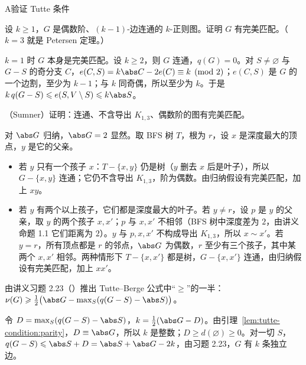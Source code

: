\begin{exercises}{A}{验证 Tutte 条件}
\item\label{ex:tutte-condition:A1} 设 $k\geqslant1$，$G$ 是偶数阶、$(k-1)$-边连通的 $k$-正则图。证明 $G$ 有完美匹配。（$k=3$ 就是 Petersen 定理。）
\begin{solution}
$k=1$ 时 $G$ 本身是完美匹配。设 $k\geqslant2$，则 $G$ 连通，$q(G)=0$。对 $S\neq\varnothing$ 与 $G-S$ 的奇分支 $C$，$e(C,S)=k\abs C-2e(C)\equiv k\pmod2$；$e(C,S)$ 是 $G$ 的一个边割，至少为 $k-1$；与 $k$ 同奇偶，所以至少为 $k$。于是 $k\,q(G-S)\leqslant e(S,V\setminus S)\leqslant k\abs S$。
\end{solution}

\item\label{ex:tutte-condition:A2} （Sumner）证明：连通、不含导出 $K_{1,3}$、偶数阶的图有完美匹配。
\begin{solution}
对 $\abs G$ 归纳，$\abs G=2$ 显然。取 BFS 树 $T$，根为 $r$，设 $x$ 是深度最大的顶点，$y$ 是它的父亲。
\begin{itemize}
\item 若 $y$ 只有一个孩子 $x$：$T-\{x,y\}$ 仍是树（$y$ 删去 $x$ 后是叶子），所以 $G-\{x,y\}$ 连通；它仍不含导出 $K_{1,3}$，阶为偶数。由归纳假设有完美匹配，加上 $xy$。
\item 若 $y$ 有两个以上孩子，它们都是深度最大的叶子。若 $y\neq r$，设 $p$ 是 $y$ 的父亲，取 $y$ 的两个孩子 $x,x'$；$p$ 与 $x,x'$ 不相邻（BFS 树中深度差为 $2$，由讲义命题 1.1 它们距离为 $2$）。$y$ 与 $p,x,x'$ 不构成导出 $K_{1,3}$，所以 $x\sim x'$。若 $y=r$，所有顶点都是 $r$ 的邻点，$\abs G$ 为偶数，$r$ 至少有三个孩子，其中某两个 $x,x'$ 相邻。两种情形下 $T-\{x,x'\}$ 都是树，$G-\{x,x'\}$ 连通，由归纳假设有完美匹配，加上 $xx'$。\qedhere
\end{itemize}
\end{solution}

\item\label{ex:tutte-condition:A3} 由讲义习题 2.23（）推出 Tutte--Berge 公式中“$\geqslant$”的一半：$\nu(G)\geqslant\frac12\bigl(\abs G-\max_S(q(G-S)-\abs S)\bigr)$。
\begin{solution}
令 $D=\max_S(q(G-S)-\abs S)$，$k=\frac12(\abs G-D)$。由引理~\ref{lem:tutte-condition:parity}，$D\equiv\abs G$，所以 $k$ 是整数；$D\geqslant d(\varnothing)\geqslant0$。对一切 $S$，$q(G-S)\leqslant\abs S+D=\abs S+\abs G-2k$，由习题 2.23，$G$ 有 $k$ 条独立边。
\end{solution}


\end{exercises}
